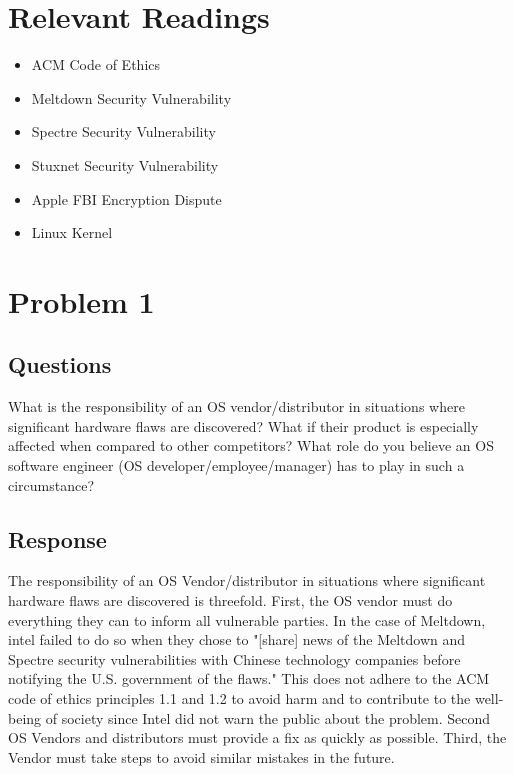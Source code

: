 \documentclass{assignment-x}
\begin{document}
\maketitle
\pagebreak

\section{Relevant Readings}
\begin{itemize}
    \item ACM Code of Ethics \cite{ACMCodeOfEthics}
    \item Meltdown Security Vulnerability \cite{meltdownWikipedia}
    \item Spectre Security Vulnerability \cite{spectre_wikipedia}
    \item Stuxnet Security Vulnerability \cite{stuxnet_wikipedia}
    \item Apple FBI Encryption Dispute \cite{apple_fbi_encryption_dispute_wikipedia}
    \item Linux Kernel \cite{linux_kernel_wikipedia}
\end{itemize}


\section{Problem 1}
\subsection{Questions}
What is the responsibility of an OS vendor/distributor in situations where significant hardware flaws are discovered?
What if their product is especially affected when compared to other competitors?
What role do you believe an OS software engineer (OS developer/employee/manager) has to play in such a circumstance?
\subsection{Response}
The responsibility of an OS Vendor/distributor in situations where significant hardware flaws are discovered is threefold. First, the OS vendor must do everything they can to inform all vulnerable parties. In the case of Meltdown, intel failed to do so when they chose to "[share] news of the Meltdown and Spectre security vulnerabilities with Chinese technology companies before notifying the U.S. government of the flaws."\cite{meltdownWikipedia} This does not adhere to the ACM code of ethics principles 1.1 and 1.2 to avoid harm and to contribute to the well-being of society \cite{ACMCodeOfEthics} since Intel did not warn the public about the problem. Second OS Vendors and distributors must provide a fix as quickly as possible. Third, the Vendor must take steps to avoid similar mistakes in the future.
\end{document}
